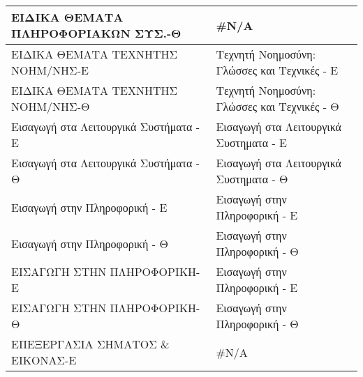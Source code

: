 \documentclass[12pt,a4paper,final]{article}
\begin{document}
\begin{landscape}
\begin{center}
\begin{longtable}{|l|l|}
\hline
ΕΙΔΙΚΑ ΘΕΜΑΤΑ ΠΛΗΡΟΦΟΡΙΑΚΩΝ ΣΥΣ.-Θ                                                                              & \#N/A                                                                                                                \\ 
\hline
ΕΙΔΙΚΑ ΘΕΜΑΤΑ ΤΕΧΝΗΤΗΣ ΝΟΗΜ/ΝΗΣ-Ε                                                                               & Τεχνητή Νοημοσύνη: Γλώσσες και Τεχνικές - Ε                                                                          \\ 
\hline
ΕΙΔΙΚΑ ΘΕΜΑΤΑ ΤΕΧΝΗΤΗΣ ΝΟΗΜ/ΝΗΣ-Θ                                                                               & Τεχνητή Νοημοσύνη: Γλώσσες και Τεχνικές - Θ                                                                          \\ 
\hline
Εισαγωγή στα Λειτουργικά Συστήματα - Ε                                                                          & Εισαγωγή στα Λειτουργικά Συστηματα - Ε                                                                               \\ 
\hline
Εισαγωγή στα Λειτουργικά Συστήματα - Θ                                                                          & Εισαγωγή στα Λειτουργικά Συστηματα - Θ                                                                               \\ 
\hline
Εισαγωγή στην Πληροφορική - Ε                                                                                   & Εισαγωγή στην Πληροφορική - Ε                                                                                        \\ 
\hline
Εισαγωγή στην Πληροφορική - Θ                                                                                   & Εισαγωγή στην Πληροφορική - Θ                                                                                        \\ 
\hline
ΕΙΣΑΓΩΓΗ ΣΤΗΝ ΠΛΗΡΟΦΟΡΙΚΗ-Ε                                                                                     & Εισαγωγή στην Πληροφορική - Ε                                                                                        \\ 
\hline
ΕΙΣΑΓΩΓΗ ΣΤΗΝ ΠΛΗΡΟΦΟΡΙΚΗ-Θ                                                                                     & Εισαγωγή στην Πληροφορική - Θ                                                                                        \\ 
\hline
ΕΠΕΞΕΡΓΑΣΙΑ ΣΗΜΑΤΟΣ \& ΕΙΚΟΝΑΣ-Ε                                                                                & \#N/A                                                                                                                \\ 

\end{longtable}
\end{center}
\end{landscape}
\end{document}
